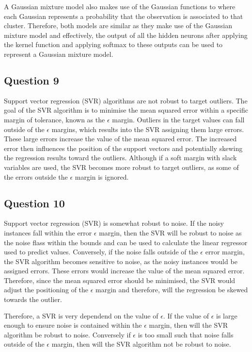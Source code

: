 \documentclass[10pt]{article}
\begin{document}
A Gaussian mixture model also makes use of the Gaussian functions to where each Gaussian represents a probability that the observation
is associated to that cluster. Therefore, both models are similar as they make use of the Gaussian mixture model and
effectively, the output of all the hidden neurons after applying the kernel function and applying softmax to these outputs
can be used to represent a Gaussian mixture model.

\subsection*{Question 9}

Support vector regression (SVR) algorithms are not robust to target outliers. The goal of the SVR algorithm
is to minimise the mean squared error within a specific margin of tolerance, known as the $\epsilon$ margin.
Outliers in the target values can fall outside of the $\epsilon$ margins, which results into the SVR assigning
them large errors. These large errors increase the value of the mean squared error. The increased error then influences
the position of the support vectors and potentially skewing the regression results toward the outliers. Although if
a soft margin with slack variables are used, the SVR becomes more robust to target outliers, as some of the errors outside the
$\epsilon$ margin is ignored.

\subsection*{Question 10}

Support vector regression (SVR) is somewhat robust to noise. If the noisy instances fall within the error
$\epsilon$ margin, then the SVR will be robust to noise as the noise flass within the bounds and can be used
to calculate the linear regressor used to predict values. Conversely, if the noise falls outside of the $\epsilon$
error margin, the SVR algorithm becomes sensitive to noise, as the noisy instances would be assigned errors. These errors
would increase the value of the mean squared error. Therefore, since the mean squared error should be minimised, the
SVR would adjust the positioning of the $\epsilon$ margin and therefore, will the regression be skewed towards the outlier.

Therefore, a SVR is very dependend on the value of $\epsilon$. If the value of $\epsilon$ is large enough
to ensure noise is contained within the $\epsilon$ margin, then will the SVR algorithm be robust to noise. Conversely
if $\epsilon$ is too small such that noise falls outside of the $\epsilon$ margin, then will the SVR algorithm not be robust to noise. 
\end{document}
